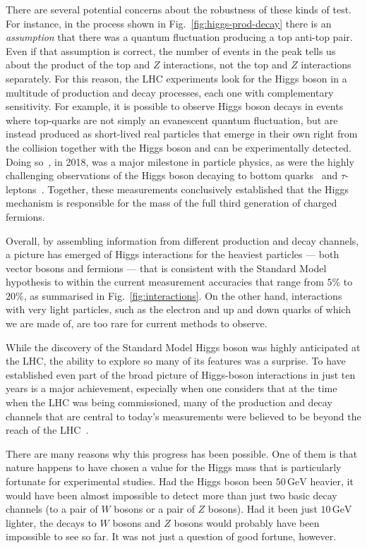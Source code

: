 \documentclass[12pt]{article}
\newcommand{\GeV}{\,\text{GeV}}
\begin{document}
There are several potential concerns about the robustness of these
kinds of test.
%
For instance, in the process shown in Fig.~\ref{fig:higgs-prod-decay}
there is an \emph{assumption} that there was a quantum fluctuation
producing a top anti-top pair.
%
Even if that assumption is correct, the number of events in the peak
tells us about the product of the top and $Z$ interactions, not the
top and $Z$ interactions separately.
%
For this reason, the LHC experiments look for the Higgs boson in a
multitude of production and decay processes, each one with
complementary sensitivity.
%
For example, it is possible to observe Higgs boson decays in events
where top-quarks are not simply an evanescent quantum fluctuation, but
are instead produced as short-lived real particles that emerge in
their own right from the collision together with the Higgs boson and
can be experimentally detected. 
%
Doing so~\cite{ATLAS:2018mme,CMS:2018uxb}, in 2018, was a major
milestone in particle physics, as were
%
the highly challenging observations of the Higgs boson decaying
  to bottom
quarks~\cite{ATLAS:2020fcp,CMS:2018nsn} and
$\tau$-leptons~\cite{ATLAS:2022yrq,CMS:2021gxc}.
%
Together, these measurements conclusively established that the Higgs
mechanism is responsible for the mass of the full third generation of
charged fermions.
%

Overall, by assembling information from different production and decay
channels, a picture has emerged of Higgs interactions for the heaviest
particles --- both vector bosons and fermions --- that is consistent
with the Standard Model hypothesis to within the current measurement
accuracies that range from $5\%$ to $20\%$, as summarised in
Fig.~\ref{fig:interactions}.
%
On the other hand, interactions with very light particles, such as the
electron and up and down quarks of which we are made of, are too rare for
current methods to observe.

While the discovery of the Standard Model Higgs boson was
highly anticipated
at the LHC, the ability to explore so many of its features was
a surprise.
%
To have established even part of the broad picture of Higgs-boson
interactions in just ten years is a major achievement, especially when
one considers that at the time when the LHC was being commissioned, many
of the production and decay channels that are central to
today's measurements were believed to be beyond the reach of the
LHC~\cite{CMS:2007sch,ATLAS:2009zsq}.

There are many reasons why this progress has been possible.
%
One of them is that nature happens to have chosen a value for
the Higgs mass that is particularly fortunate for experimental
studies.
% 
Had the Higgs boson been $50 \GeV$ heavier, it would have been almost
impossible to detect more than just two basic decay channels (to a
pair of $W$ bosons or a pair of $Z$ bosons).
%
Had it been just $10\GeV$ lighter, the decays to $W$ bosons and $Z$ bosons
would probably have been impossible to see so far.
It was not just a question of good fortune, however.
\end{document}

